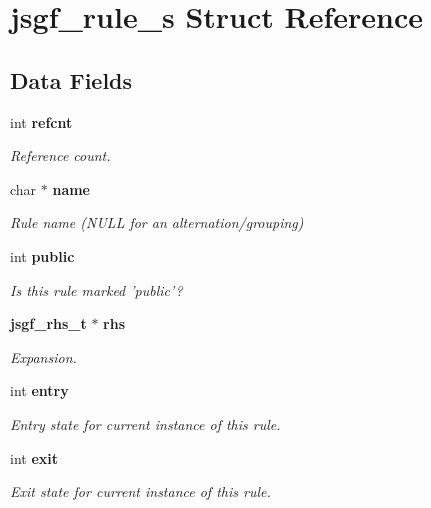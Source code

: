 \section{jsgf\-\_\-rule\-\_\-s \-Struct \-Reference}
\label{structjsgf__rule__s}
\subsection*{\-Data \-Fields}
\begin{DoxyCompactItemize}
\item 
int {\bf refcnt}
\begin{DoxyCompactList}\small\item\em \-Reference count. \end{DoxyCompactList}\item 
char $\ast$ {\bf name}\label{structjsgf__rule__s_a1b1de5afa4c0f27df4e8d51ebc47ca92}

\begin{DoxyCompactList}\small\item\em \-Rule name (\-N\-U\-L\-L for an alternation/grouping) \end{DoxyCompactList}\item 
int {\bf public}\label{structjsgf__rule__s_acf6dcb033906d79f3c10d411aad4e318}

\begin{DoxyCompactList}\small\item\em \-Is this rule marked 'public'? \end{DoxyCompactList}\item 
{\bf jsgf\-\_\-rhs\-\_\-t} $\ast$ {\bf rhs}\label{structjsgf__rule__s_a6923b74ad72f8b663cc00dfa99490981}

\begin{DoxyCompactList}\small\item\em \-Expansion. \end{DoxyCompactList}\item 
int {\bf entry}
\begin{DoxyCompactList}\small\item\em \-Entry state for current instance of this rule. \end{DoxyCompactList}\item 
int {\bf exit}
\begin{DoxyCompactList}\small\item\em \-Exit state for current instance of this rule. \end{DoxyCompactList}\end{DoxyCompactItemize}


